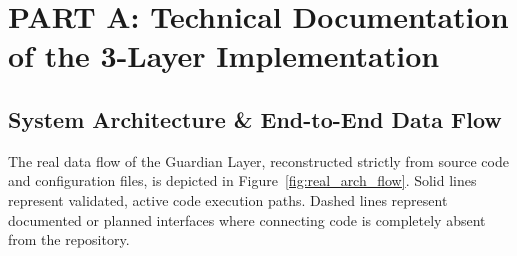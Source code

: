 \documentclass[10pt,a4paper]{report}
\begin{document}
\chapter{PART A: Technical Documentation of the 3-Layer Implementation}

\section{System Architecture \& End-to-End Data Flow}
The real data flow of the Guardian Layer, reconstructed strictly from source code and configuration files, is depicted in Figure~\ref{fig:real_arch_flow}. Solid lines represent validated, active code execution paths. Dashed lines represent documented or planned interfaces where connecting code is completely absent from the repository.
\end{document}
